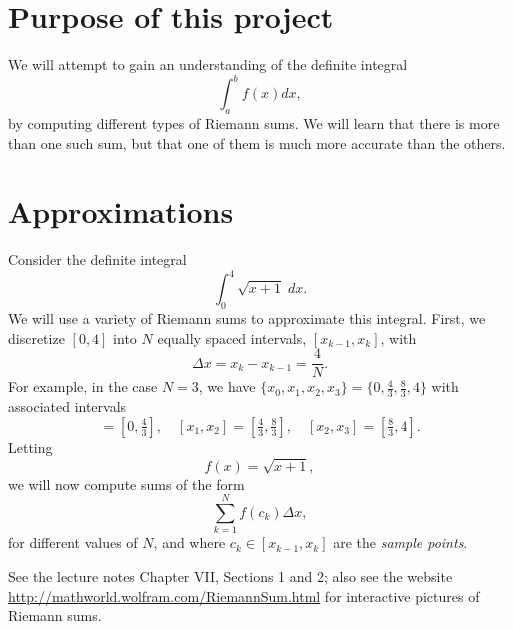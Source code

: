 


\section{Purpose of this project}

We will attempt to gain an understanding of the definite integral
\begin{equation*}
  \int_a^b f(x) dx,
\end{equation*}
by computing different types of Riemann sums.  We will learn that
there is more than one such sum, but that one of them is much more
accurate than the others.



\section{Approximations}

Consider the definite integral
\begin{equation*}
  \int_{0}^4 \sqrt{x+1} \;  dx.
\end{equation*}
We will use a variety of Riemann sums to approximate this integral.
First, we discretize $[0,4]$ into $N$ equally spaced intervals,
$[x_{k-1},x_{k}]$, with
\[
\Delta x = x_{k} - x_{k-1} = \frac{4}{N}.
\]
For example, in the case $N = 3$, we have $\{x_0,x_1,x_2,x_3\} =
\{0,\frac43,\frac83,4\}$ with associated intervals
\begin{equation*}
  [x_0,x_1] = [0,\tfrac43], \quad [x_1,x_2] = [\tfrac43,\tfrac83],
  \quad [x_2,x_3] = [\tfrac83,4].
\end{equation*}
Letting
\[
f(x) = \sqrt{x+1},
\]
we will now compute sums of the form
\begin{equation*}
  \sum_{k=1}^{N} f(c_k) \Delta x,
\end{equation*}
for different values of $N$, and where $c_k \in [x_{k-1},x_{k}]$ are the
\textit{sample points}.

\begin{center}
  See the lecture notes Chapter VII, Sections 1 and 2; also see the website
  \url{http://mathworld.wolfram.com/RiemannSum.html} for interactive pictures of
  Riemann sums.
\end{center}


